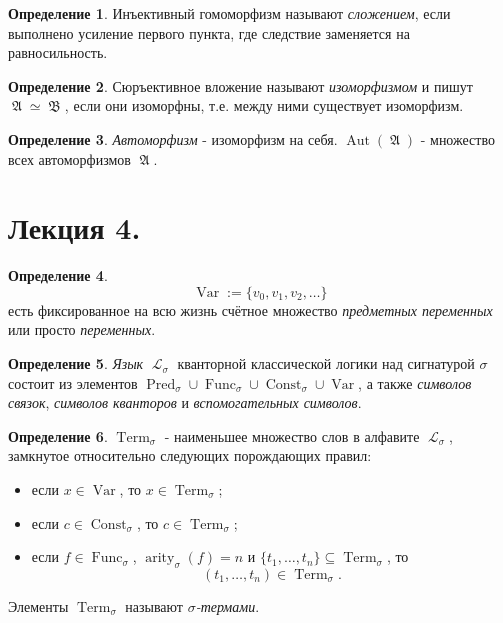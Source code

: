 \documentclass[a4paper,100pt]{article}
\theoremstyle{indented}
\theoremstyle{definition}
\newtheorem{defn}{Определение}
\theoremstyle{remark}
\DeclareMathOperator{\LL}{\mathscr{L}}
\DeclareMathOperator{\Pred}{Pred}
\DeclareMathOperator{\Func}{Func}
\DeclareMathOperator{\Const}{Const}
\DeclareMathOperator{\arity}{arity}
\DeclareMathOperator{\Aut}{Aut}
\DeclareMathOperator{\Var}{Var}
\DeclareMathOperator{\Term}{Term}
\DeclareMathOperator{\GA}{\mathfrak{A}}
\DeclareMathOperator{\GB}{\mathfrak{B}}
\begin{document}
\begin{defn}
  Инъективный гомоморфизм называют \textit{сложением}, если выполнено усиление первого пункта, где следствие заменяется на равносильность.
\end{defn}

\begin{defn}
  Сюръективное вложение называют \textit{изоморфизмом} и пишут $\GA \simeq \GB$, если они изоморфны, т.е. между ними существует изоморфизм.
\end{defn}

\begin{defn}
  \textit{Автоморфизм} - изоморфизм на себя. $\Aut(\GA)$ - множество всех автоморфизмов $\GA$. 
\end{defn}

\section{Лекция 4.} 

\begin{defn}
  \[
    \Var:=\{v_0, v_1, v_2, \ldots \}
  \]
  есть фиксированное на всю жизнь счётное множество \textit{предметных переменных} или просто \textit{переменных}.
\end{defn}

\begin{defn}
  \textit{Язык} $\LL_\sigma$ кванторной классической логики над сигнатурой $\sigma$ состоит из элементов $\Pred_\sigma \cup \Func_\sigma \cup \Const_\sigma \cup \Var$, а также \textit{символов связок}, \textit{символов кванторов} и \textit{вспомогательных символов}.
\end{defn}

\begin{defn}
  $\Term_\sigma$ - наименьшее множество слов в алфавите $\LL_\sigma$, замкнутое относительно следующих порождающих правил: 
  
  \begin{itemize}
    \item если $x\in \Var$, то $x\in \Term_\sigma$; 
    \item если $c\in \Const_\sigma$, то $c\in \Term_\sigma$; 
    \item если $f\in \Func_\sigma$, $\arity_\sigma (f)=n$ и $\{t_1, \ldots, t_n\}\subseteq \Term_\sigma$, то 
    \[
      (t_1, \ldots, t_n)\in \Term_\sigma.
    \]
  \end{itemize}

  Элементы $\Term_\sigma$ называют \textit{$\sigma$-термами}.
\end{defn}
\end{document}
